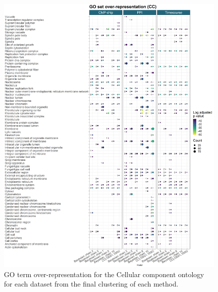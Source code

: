 \documentclass[]{article}
\begin{document}
\begin{figure}
	\centering
	\includegraphics[scale=0.365]{./Images/Yeast/goEnrichmentCompCCvertical.png}
	\caption{GO term over-representation for the Cellular component ontology for each dataset from the final clustering of each method.}
	\label{fig:yeastGOCC}
\end{figure}

%
%


  
\end{document}
